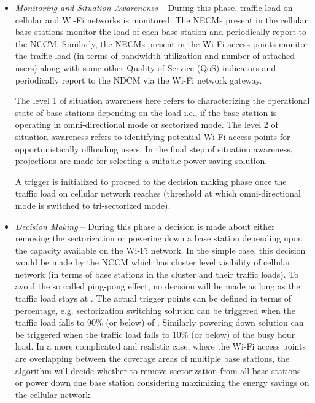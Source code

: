 \documentclass[journal]{IEEEtran}
\begin{document}
\begin{itemize}


\item \emph{Monitoring and Situation Awarenenss} -- During this phase, traffic load on cellular and Wi-Fi networks is monitored. The NECMs present in the cellular base stations monitor the load of each base station and periodically report to the NCCM. Similarly, the NECMs present in the Wi-Fi access points monitor the traffic load (in terms of bandwidth utilization and number of attached users) along with some other Quality of Service (QoS) indicators and periodically report to the NDCM via the Wi-Fi network gateway. 

The level 1 of situation awareness here refers to characterizing the operational state of base stations depending on the load i.e., if the base station is operating in omni-directional mode or sectorized mode. The level 2 of situation awareness refers to identifying potential Wi-Fi access points for opportunistically offloading users. In the final step of situation awareness, projections are made for selecting a suitable power saving solution. 

A trigger is initialized to proceed to the decision making phase once the traffic load on cellular network reaches  (threshold at which omni-directional mode is switched to tri-sectorized mode).

\item \emph{Decision Making} -- During this phase a decision is made about either removing the sectorization or powering down
a base station depending upon the capacity available on the Wi-Fi network. In the simple case, this decision would be made by the NCCM which has cluster level visibility of cellular network (in terms of base stations in the cluster and their traffic loads). To avoid the so called ping-pong effect, no decision will be made as long as the traffic load stays at .  The actual trigger points can be defined in terms of percentage, e.g. sectorization switching solution can be triggered when the traffic load falls to 90\% (or below) of . Similarly powering down solution can be triggered when the traffic load falls to 10\% (or below) of the busy hour load. In a more complicated and realistic case, where the Wi-Fi access points are overlapping between the coverage areas of multiple base stations, the algorithm will decide whether to remove sectorization from all base stations or power down one base station considering maximizing the energy savings on the cellular network.


\end{itemize}
\end{document}
